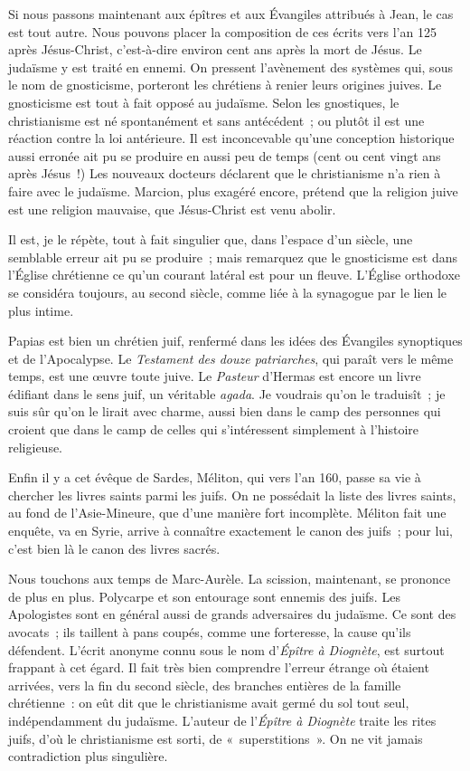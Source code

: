 \documentclass[french,twoside]{book} %
\newcommand\orgName[1]{#1}
\newcommand\persName[1]{#1}
\newcommand\placeName[1]{#1}
\begin{document}
Si nous passons maintenant aux épîtres et aux Évangiles attribués à {\persName Jean}, le cas est tout autre. Nous pouvons placer la composition de ces écrits vers l’an 125 après Jésus-Christ, c’est-à-dire environ cent ans après la mort de {\persName Jésus}. Le judaïsme y est traité en ennemi. On pressent l’avènement des systèmes qui, sous le nom de gnosticisme, porteront les chrétiens à renier leurs origines juives. Le gnosticisme est tout à fait opposé au judaïsme. Selon les gnostiques, le christianisme est né spontanément et sans antécédent ; ou plutôt il est une réaction contre la loi antérieure. Il est inconcevable qu’une conception historique aussi erronée ait pu se produire en aussi peu de temps (cent ou cent vingt ans après {\persName Jésus} !) Les nouveaux docteurs déclarent que le christianisme n’a rien à faire avec le judaïsme. Marcion, plus exagéré encore, prétend que la religion juive est une religion mauvaise, que {\persName Jésus-Christ} est venu abolir.\par
Il est, je le répète, tout à fait singulier que, dans l’espace d’un siècle, une semblable erreur ait pu se produire ; mais remarquez que le gnosticisme est dans l’{\orgName Église chrétienne} ce qu’un courant latéral est pour un fleuve. L’{\orgName Église orthodoxe} se considéra toujours, au second siècle, comme liée à la {\orgName synagogue} par le lien le plus intime.\par
{\persName Papias} est bien un chrétien juif, renfermé dans les idées des Évangiles synoptiques et de l’Apocalypse. Le \emph{Testament des douze patriarches}, qui paraît vers le même temps, est une œuvre toute juive. Le \emph{Pasteur} d’{\persName Hermas} est encore un livre édifiant dans le sens juif, un véritable {\itshape agada}. Je voudrais qu’on le traduisît ; je suis sûr qu’on le lirait avec charme, aussi bien dans le camp des personnes qui croient que dans le camp de celles qui s’intéressent simplement à l’histoire religieuse.\par
Enfin il y a cet évêque de {\placeName Sardes}, {\persName Méliton}, qui vers l’an 160, passe sa vie à chercher les livres saints parmi les juifs. On ne possédait la liste des livres saints, au fond de l’{\placeName Asie-Mineure}, que d’une manière fort incomplète. {\persName Méliton} fait une enquête, va en {\placeName Syrie}, arrive à connaître exactement le canon des juifs ; pour lui, c’est bien là le canon des livres sacrés.\par
Nous touchons aux temps de {\persName Marc-Aurèle}. La scission, maintenant, se prononce de plus en plus. {\persName Polycarpe} et son entourage sont ennemis des juifs. Les {\orgName Apologistes} sont en général aussi de grands adversaires du judaïsme. Ce sont des avocats ; ils taillent à pans coupés, comme une forteresse, la cause qu’ils défendent. L’écrit anonyme connu sous le nom d’\emph{Épître à Diognète}, est surtout frappant à cet égard. Il fait très bien comprendre l’erreur étrange où étaient arrivées, vers la fin du second siècle, des branches entières de la famille chrétienne : on eût dit que le christianisme avait germé du sol tout seul, indépendamment du judaïsme. L’auteur de l’\emph{Épître à Diognète} traite les rites juifs, d’où le christianisme est sorti, de « superstitions ». On ne vit jamais contradiction plus singulière.\par
\end{document}

